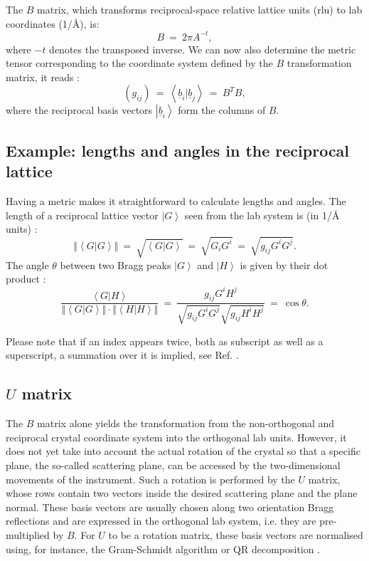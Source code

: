 The $B$ matrix, which transforms reciprocal-space relative lattice units (rlu) to lab coordinates (1/\AA), is:
\begin{equation} B \ =\  2 \pi A^{-t}, \end{equation}
where $-t$ denotes the transposed inverse.
We can now also determine the metric tensor corresponding to the coordinate system defined by the $B$ transformation matrix, it reads \cite[p. 808]{Arens2015}:
\begin{equation}
	\left(g_{ij}\right) \ =\  \left<\underline{b}_i | \underline{b}_j \right> \ =\  B^T B,
\end{equation}
where the reciprocal basis vectors $\left| \underline{b}_i \right>$ form the columns of $B$.


\subsection{Example: lengths and angles in the reciprocal lattice}
Having a metric makes it straightforward to calculate lengths and angles.
The length of a reciprocal lattice vector $\left| G \right>$ seen from the lab system is (in 1/\AA{} units) \cite[p. 808]{Arens2015}:
\begin{equation}
	\left\Vert \left< G | G \right> \right\Vert \ =\  \sqrt{\left< G | G \right>} \ =\  \sqrt{G_i G^i} \ =\  \sqrt{g_{ij} G^i G^j}.
\end{equation}
The angle $\theta$ between two Bragg peaks $\left| G \right>$ and $\left| H \right>$ is given by their dot product \cite[p. 808]{Arens2015}:
\begin{equation}
	\frac{\left< G | H \right>}{\left\Vert \left< G | G \right> \right\Vert \cdot \left\Vert \left< H | H \right> \right\Vert} \ =\  
	\frac{g_{ij} G^i H^j }{\sqrt{g_{ij} G^i G^j} \sqrt{g_{ij} H^i H^j}} \ =\  \cos \theta.
\end{equation}

Please note that if an index appears twice, both as subscript as well as a superscript, a summation over it is implied, see Ref. \cite{wiki_summation}.


\subsection{$U$ matrix}
The $B$ matrix alone yields the transformation from the non-orthogonal and reciprocal crystal coordinate system into the orthogonal lab units.
However, it does not yet take into account the actual rotation of the crystal so that a specific plane, the so-called scattering plane, 
can be accessed by the two-dimensional movements of the instrument. 
Such a rotation is performed by the $U$ matrix, whose rows contain two vectors inside the desired scattering plane and the plane normal. 
These basis vectors are usually chosen along two orientation Bragg reflections and are expressed in the orthogonal lab system, i.e. they are
pre-multiplied by $B$.
For $U$ to be a rotation matrix, these basis vectors are normalised using, for instance, the Gram-Schmidt algorithm \cite[p. 744]{Arens2015} or 
QR decomposition \cite[pp. 269-272]{Scarpino2011}.

